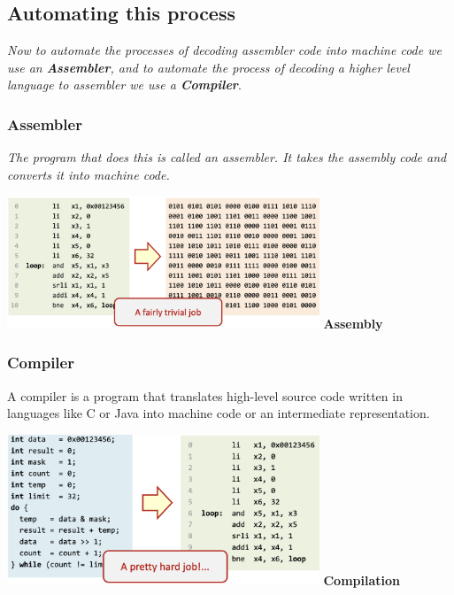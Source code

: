 \newpage
\subsection{Automating this process}
\textit{Now to automate the processes of decoding assembler code into machine code we use an \textbf{Assembler}, and to automate the process of decoding a higher level language to assembler we use a \textbf{Compiler}}. \newline
\subsubsection{Assembler}
\textit{The program that does this is called an assembler. It takes the assembly code and converts it into machine code.} \newline
\begin{center}
    \includegraphics[width=0.7\textwidth]{chapters/chapter1a/images/assembler.png}
    \centering
    \textbf{Assembly}
\end{center}
\subsubsection{Compiler}
A compiler is a program that translates high-level source code written in languages like C or Java into machine code or an intermediate representation. 
\begin{center}
    \includegraphics[width=0.7\textwidth]{chapters/chapter1a/images/compiler.png}
    \centering
    \textbf{Compilation}
\end{center}

\newpage
